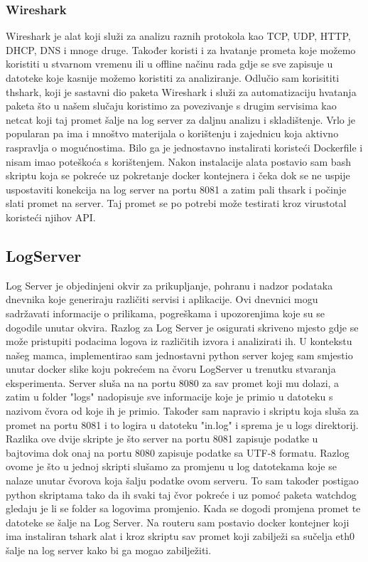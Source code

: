 \documentclass[times, utf8, zavrsni]{fer}
\begin{document}
\subsubsection{Wireshark}
Wireshark je alat koji služi za analizu raznih protokola kao TCP, UDP, HTTP, DHCP, DNS i mnoge druge. Također koristi i za hvatanje prometa koje možemo koristiti u stvarnom vremenu ili u offline načinu rada gdje se sve zapisuje u datoteke koje kasnije možemo koristiti za analiziranje. Odlučio sam korisititi thshark, koji je sastavni dio paketa Wireshark i služi za automatizaciju hvatanja paketa što u našem slučaju koristimo za povezivanje s drugim servisima kao netcat koji taj promet šalje na log server za daljnu analizu i skladištenje. Vrlo je popularan pa ima i mnoštvo materijala o korištenju i zajednicu koja aktivno raspravlja o mogućnostima. Bilo ga je jednostavno instalirati koristeći Dockerfile i nisam imao poteškoća s korištenjem. Nakon instalacije alata postavio sam bash skriptu koja se pokreće uz pokretanje docker kontejnera i čeka dok se ne uspije uspostaviti konekcija na log server na portu 8081 a zatim pali thsark i počinje slati promet na server. Taj promet se po potrebi može testirati kroz virustotal koristeći njihov API.  

\subsection{LogServer}
Log Server je objedinjeni okvir za prikupljanje, pohranu i nadzor podataka dnevnika koje generiraju različiti servisi i aplikacije. Ovi dnevnici mogu sadržavati informacije o prilikama, pogreškama i upozorenjima koje su se dogodile unutar okvira. Razlog za Log Server je osigurati skriveno mjesto gdje se  može pristupiti podacima logova iz različitih izvora i analizirati ih. U kontekstu našeg mamca, implementirao sam jednostavni python server kojeg sam smjestio unutar docker slike koju pokrećem na čvoru LogServer u trenutku stvaranja eksperimenta. Server sluša na na portu 8080 za sav promet koji mu dolazi, a zatim u folder "logs" nadopisuje sve informacije koje je primio u datoteku s nazivom čvora od koje ih je primio. Također sam napravio i skriptu koja sluša za promet na portu 8081 i to logira u datoteku "in.log" i sprema je u logs direktorij. Razlika ove dvije skripte je što server na portu 8081 zapisuje podatke u bajtovima dok onaj na portu 8080 zapisuje podatke sa UTF-8 formatu. Razlog ovome je što u jednoj skripti slušamo za promjenu u log datotekama koje se nalaze unutar čvorova koja šalju podatke ovom serveru. To sam također postigao python skriptama tako da ih svaki taj čvor pokreće i uz pomoć paketa watchdog gledaju je li se folder sa logovima promjenio. Kada se dogodi promjena promet te datoteke se šalje na Log Server.
Na routeru sam postavio docker kontejner koji ima instaliran tshark alat i kroz skriptu sav promet koji zabilježi sa sučelja eth0 šalje na log server kako bi ga mogao zabilježiti.
\end{document}
